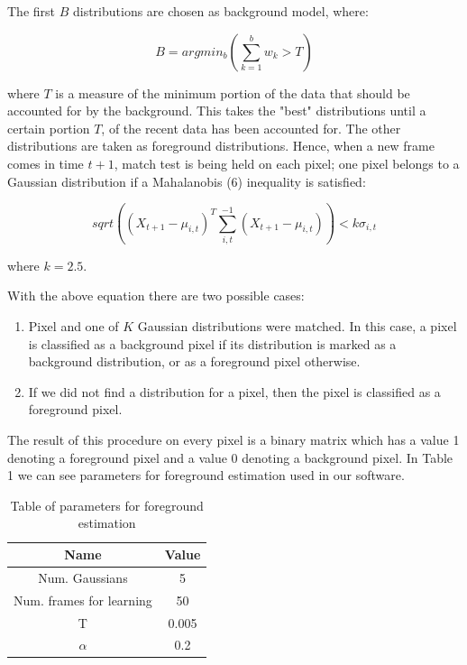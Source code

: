 \documentclass[12pt]{article} %
\begin{document}
The first $B$ distributions are chosen as background model, where:

\begin{equation}
B = argmin_{b}(\sum_{k=1}^{b}w_{k} > T)
\end{equation}

where $T$ is a measure of the minimum portion of the data that should be accounted for by the background. This takes the "best" distributions until a certain portion $T$, of the recent data has been accounted for. The other distributions are taken as foreground distributions. 
Hence, when a new frame comes in time $t+1$, match test is being held on each pixel; one pixel belongs to a Gaussian distribution if a Mahalanobis (6) inequality is satisfied:

\begin{equation}
sqrt((X_{t+1}-\mu_{i,t})^T\sum_{i,t}^{-1}(X_{t+1}-\mu_{i,t})) < k\sigma_{i,t}
\end{equation}

where $k=2.5$.

With the above equation there are two possible cases:

\begin{enumerate}
\item Pixel and one of $K$ Gaussian distributions were matched. In this case, a pixel is classified as a background pixel if its distribution is marked as a background distribution, or as a foreground pixel otherwise.
\item If we did not find a distribution for a pixel, then the pixel is classified as a foreground pixel.
\end{enumerate}

The result of this procedure on every pixel is a binary matrix which has a value 1 denoting a foreground pixel and a value 0 denoting a background pixel. In Table 1 we can see parameters for foreground estimation used in our software.





\begin{table}
\begin{center}
 \begin{tabular}{||c  c||} 
 \hline
 Name & Value \\ [0.5ex] 
 \hline\hline
 Num. Gaussians & 5  \\ 
 \hline
 Num. frames for learning & 50 \\
 \hline
 T & 0.005 \\
 \hline
 $\alpha$ & 0.2\\
 \hline

\end{tabular}
\end{center}
\caption{Table of parameters for foreground estimation}
\label{table:1}
\end{table}
\end{document}
